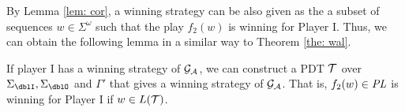 By Lemma \ref{lem: cor},
a winning strategy can be also given as
the a subset of sequences $w\in\Sigma^\omega$
such that the play $f_2(w)$ is winning for Player I.
Thus, we can obtain the following lemma
in a similar way to Theorem \ref{the: wal}.
\begin{corollary}
\label{col: 2}
If player I has a winning strategy of ${\cal G}_{\cal A}$,
we can construct a PDT ${\cal T}$ over $\Sigma_\dblI, \Sigma_\dblO$ and $\Gamma'$ that gives a winning strategy of ${\cal G}_{\cal A}$.
That is, $f_2(w)\in \mathit{PL}$ is winning for Player I if $w\in L({\cal T})$.
\end{corollary}
